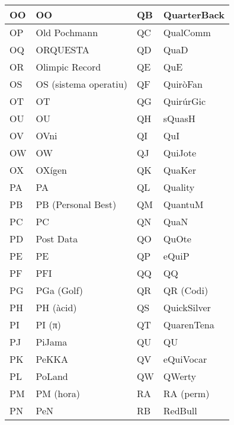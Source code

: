 \begin{table}[h]
    \centering
    \begin{tabular}{|l|l|l|l|}
    \hline
    OO & OO                    & QB & QuarterBack      \\ \hline
    OP & Old Pochmann          & QC & QualComm         \\ \hline
    OQ & ORQUESTA              & QD & QuaD             \\ \hline
    OR & Olimpic Record        & QE & QuE              \\ \hline
    OS & OS (sistema operatiu) & QF & QuiròFan         \\ \hline
    OT & OT                    & QG & QuirúrGic        \\ \hline
    OU & OU                    & QH & sQuasH           \\ \hline
    OV & OVni                  & QI & QuI              \\ \hline
    OW & OW                    & QJ & QuiJote          \\ \hline
    OX & OXígen                & QK & QuaKer           \\ \hline
    PA & PA                    & QL & Quality          \\ \hline
    PB & PB (Personal Best)    & QM & QuantuM          \\ \hline
    PC & PC                    & QN & QuaN             \\ \hline
    PD & Post Data             & QO & QuOte            \\ \hline
    PE & PE                    & QP & eQuiP            \\ \hline
    PF & PFI                   & QQ & QQ               \\ \hline
    PG & PGa (Golf)            & QR & QR (Codi)        \\ \hline
    PH & PH (àcid)             & QS & QuickSilver      \\ \hline
    PI & PI (π)                & QT & QuarenTena       \\ \hline
    PJ & PiJama                & QU & QU               \\ \hline
    PK & PeKKA                 & QV & eQuiVocar        \\ \hline
    PL & PoLand                & QW & QWerty           \\ \hline
    PM & PM (hora)             & RA & RA (perm)        \\ \hline
    PN & PeN                   & RB & RedBull          \\ \hline

\end{tabular}
\end{table}
